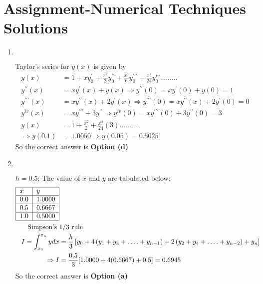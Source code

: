 \chapter{Assignment-Numerical Techniques Solutions}
\begin{enumerate}
	\item $\left. \right. $
	\begin{answer}
		Taylor's series for $y(x)$ is given by
		\begin{align*}
		y(x)&=1+x y_{0}^{\prime}+\frac{x^{2}}{2} y_{0}^{\prime \prime}+\frac{x^{3}}{6} y_{0}^{\prime \prime \prime}+\frac{x^{4}}{24} y_{0}^{i v} \ldots \ldots \ldots\\
		y^{\prime \prime}(x)&=x y^{\prime}(x)+y(x) \Rightarrow y^{\prime \prime}(0)=x y^{\prime}(0)+y(0)=1\\
		y^{\prime \prime \prime}(x)&=x y^{\prime \prime}(x)+2 y^{\prime}(x) \Rightarrow y^{\prime \prime \prime}(0)=x y^{\prime \prime}(x)+2 y^{\prime}(0)=0\\
		y^{i v}(x)&=x y^{\prime \prime \prime}+3 y^{\prime \prime} \Rightarrow y^{i v}(0)=x y^{\prime \prime \prime}(0)+3 y^{\prime \prime}(0)=3\\
		y(x)&=1+\frac{x^{2}}{2}+\frac{x^{4}}{24}(3) \ldots \ldots \ldots\\
		\Rightarrow y(0.1)&=1.0050 \Rightarrow y(0.05)=0.5025
		\end{align*}
		So the correct answer is \textbf{Option (d)}		
	\end{answer}
	\item $\left. \right. $
	\begin{answer}
		$h=0.5$; The value of $x$ and $y$ are tabulated below:
		\begin{align*}
		\begin{tabular}{|l|l|}
		\hline$x$ & $y$ \\
		\hline $0.0$ & $1.0000$ \\
		\hline $0.5$ & $0.6667$ \\
		\hline $1.0$ & $0.5000$ \\
		\hline
		\end{tabular}\\
		\text{Simpson's }&1 / 3\text{ rule}\\
		I=\int_{x_{0}}^{x_{n}} y d x&=\frac{h}{3}\left[y_{0}+4\left(y_{1}+y_{3}+\ldots .+y_{n-1}\right)+2\left(y_{2}+y_{4}+\ldots .+y_{n-2}\right)+y_{n}\right]\\
		\Rightarrow I&=\frac{0.5}{3}[1.0000+4(0.6667)+0.5]=0.6945
		\end{align*}
			So the correct answer is \textbf{Option (a)}

\end{answer}
\end{enumerate}
